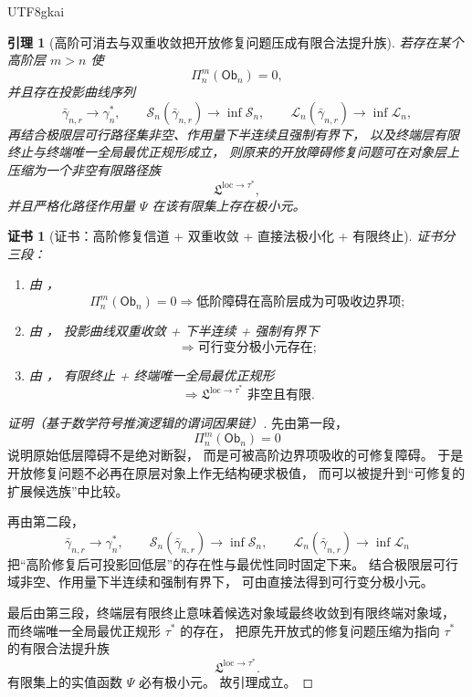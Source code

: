 \documentclass[12pt]{article}
\newtheorem{lemma}{引理}[section]
\newtheorem{Certificate}{证书}[section]
\begin{document}
\begin{CJK*}{UTF8}{gkai}
\begin{lemma}[高阶可消去与双重收敛把开放修复问题压成有限合法提升族]
\label{lem:tex1-ch5-finite-family}
若存在某个高阶层 \(m>n\) 使
\[
  \Pi_n^m(\mathsf{Ob}_n)=0,
\]
并且存在投影曲线序列
\[
  \bar{\gamma}_{n,r}\to \gamma_n^\ast,
\qquad
  \mathcal S_n(\bar{\gamma}_{n,r})\to \inf \mathcal S_n,
\qquad
  \mathcal L_n(\bar{\gamma}_{n,r})\to \inf \mathcal L_n,
\]
再结合极限层可行路径集非空、作用量下半连续且强制有界下，
以及终端层有限终止与终端唯一全局最优正规形成立，
则原来的开放障碍修复问题可在对象层上压缩为一个非空有限路径族
\[
  \mathfrak L^{\mathrm{loc}\to\tau^\ast},
\]
并且严格化路径作用量 \(\Psi\) 在该有限集上存在极小元。
\end{lemma}

\begin{Certificate}[证书：高阶修复信道 + 双重收敛 + 直接法极小化 + 有限终止]
\label{cert:tex1-ch5-finite-family}
证书分三段：
\begin{enumerate}
  \item 由 \cite{RepoTex36HomotopyTwistEquivalence}，
  \[
    \Pi_n^m(\mathsf{Ob}_n)=0
    \Rightarrow
    \text{低阶障碍在高阶层成为可吸收边界项};
  \]
  \item 由 \cite{RepoTex36HomotopyTwistEquivalence,RepoTex41HomotopyRepairBundle}，
  投影曲线双重收敛 + 下半连续 + 强制有界下
  \[
    \Rightarrow
    \text{可行变分极小元存在};
  \]
  \item 由 \cite{RepoTex38JacobiBianchiRepair}，
  有限终止 + 终端唯一全局最优正规形
  \[
    \Rightarrow
    \mathfrak L^{\mathrm{loc}\to\tau^\ast}
    \text{ 非空且有限}.
  \]
\end{enumerate}
\end{Certificate}

\begin{proof}[证明（基于数学符号推演逻辑的谓词因果链）]
先由第一段，
\[
  \Pi_n^m(\mathsf{Ob}_n)=0
\]
说明原始低层障碍不是绝对断裂，
而是可被高阶边界项吸收的可修复障碍。
于是开放修复问题不必再在原层对象上作无结构硬求极值，
而可以被提升到“可修复的扩展候选族”中比较。

再由第二段，
\[
  \bar{\gamma}_{n,r}\to \gamma_n^\ast,
\qquad
  \mathcal S_n(\bar{\gamma}_{n,r})\to \inf \mathcal S_n,
\qquad
  \mathcal L_n(\bar{\gamma}_{n,r})\to \inf \mathcal L_n
\]
把“高阶修复后可投影回低层”的存在性与最优性同时固定下来。
结合极限层可行域非空、作用量下半连续和强制有界下，
可由直接法得到可行变分极小元。

最后由第三段，终端层有限终止意味着候选对象域最终收敛到有限终端对象域，
而终端唯一全局最优正规形 \(\tau^\ast\) 的存在，
把原先开放式的修复问题压缩为指向 \(\tau^\ast\) 的有限合法提升族
\[
  \mathfrak L^{\mathrm{loc}\to\tau^\ast}.
\]
有限集上的实值函数 \(\Psi\) 必有极小元。
故引理成立。
\end{proof}


\end{CJK*}
\end{document}
